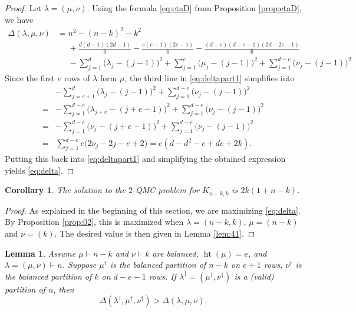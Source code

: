 \documentclass[12pt,dvipsnames,accepted=2016-08-18,a4paper,onecolumn]{quantumarticle}
\def\la{\lambda}
\DeclareMathOperator{\het}{ht}
\def\la{\lambda}
\numberwithin{equation}{section}
\newtheorem{corollary}[theorem]{Corollary}
\newtheorem{lemma}[theorem]{Lemma}
\theoremstyle{definition}
\begin{document}
\begin{proof}
Let $\lambda=(\mu,\nu)$.
Using the formula \eqref{eq:etaD} from Proposition \ref{prop:etaD}, we have
\begin{equation}\label{eq:deltapart1}
    \begin{split}
\Delta(\la,\mu,\nu) & = n^2-(n-k)^2-k^2 \\ & 
\phantom{{}={}}
+ \frac{d(d-1)(2d-1)}{6} - \frac{e(e-1)(2e-1)}{6} - \frac{(d-e)(d-e-1)(2d-2e-1)}{6} \\
&
\phantom{{}={}}
 -\sum_{j=1}^d\big( \la_j - (j-1)\big)^2
+ \sum_{j=1}^e\big( \mu_j - (j-1)\big)^2
+ \sum_{j=1}^{d-e}\big( \nu_j - (j-1)\big)^2
    \end{split}
\end{equation}
Since the first $e$ rows of $\la$ form $\mu$, 
the third line in \eqref{eq:deltapart1} simplifies into
    \begin{align*}
&-\sum_{j=e+1}^d\big( \la_j - (j-1)\big)^2
+ \sum_{j=1}^{d-e}\big( \nu_j - (j-1)\big)^2  \\
= &-\sum_{j=1}^{d-e}\big( \la_{j+e} - (j+e-1)\big)^2
+ \sum_{j=1}^{d-e}\big( \nu_j - (j-1)\big)^2 \\
= &-\sum_{j=1}^{d-e}\big( \nu_j - (j+e-1)\big)^2
+ \sum_{j=1}^{d-e}\big( \nu_j - (j-1)\big)^2 \\
= & \sum_{j=1}^{d-e} e \big( 2 \nu_j - 2j -e +2\big) 
= e (d - d^2 - e + d e + 2 k).
    \end{align*}
Putting this back into \eqref{eq:deltapart1} and simplifying the obtained expression yields \eqref{eq:delta}.
\end{proof}


\begin{corollary}\label{cor:d=2}
The solution to the $2$-QMC problem for $K_{n-k,k}$ is
$2k(1+n-k)$.
\end{corollary}

\begin{proof}
As explained in the beginning of this section, we are maximizing \eqref{eq:delta}. 
By Proposition \ref{prop:02}, this is maximized when 
$\la=(n-k,k)$, $\mu=(n-k)$ and $\nu=(k)$. The desired value is then given in Lemma \ref{lem:41}.
\end{proof}


\begin{lemma}\label{lem:42}
Assume $\mu\vdash n-k$ and $\nu\vdash k$ are balanced, 
$\het(\mu)=e$, 
and $\lambda=(\mu,\nu)\vdash n$.
Suppose $\mu^\dagger$ is the balanced partition of $n-k$ on $e+1$ rows, $\nu^\dagger$ is the balanced partition of $k$ on $d-e-1$ rows. If $\lambda^\dagger=(\mu^\dagger,\nu^\dagger)$ is a (valid) partition of $n$, then
\[
    \Delta(\la^\dagger,\mu^\dagger,\nu^\dagger) > 
    \Delta(\la,\mu,\nu).
\]
\end{lemma}
\end{document}
